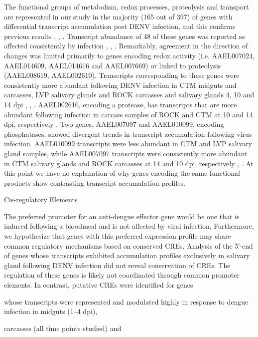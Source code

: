 The functional groups of metabolism, redox processes, proteolysis and transport are represented in our study in the majority (165 out of 397) of genes with differential transcript accumulation post DENV infection, and this confirms previous results \cite{Xi2008}, \cite{Behura2011}, \cite{Colpitts2011}.
Transcript abundance of 48 of these genes was reported as affected consistently by infection \cite{Xi2008}, \cite{Luplertlop2011}, \cite{Behura2011}.
Remarkably, agreement in the direction of changes was limited primarily to genes encoding redox activity (i.e.
AAEL007024, AAEL014609, AAEL014616 and AAEL007669) or linked to proteolysis (AAEL008619, AAEL002610).
Transcripts corresponding to these genes were consistently more abundant following DENV infection in CTM midguts and carcasses, LVP salivary glands and ROCK carcasses and salivary glands 4, 10 and 14 dpi \cite{Xi2008}, \cite{Luplertlop2011}, \cite{Sim2012}.
AAEL002610, encoding a protease, has transcripts that are more abundant following infection in carcass samples of ROCK and CTM at 10 and 14 dpi, respectively \cite{Xi2008}.
Two genes, AAEL007097 and AAEL010099, encoding phosphatases, showed divergent trends in transcript accumulation following virus infection.
AAEL010099 transcripts were less abundant in CTM and LVP salivary gland samples, while AAEL007097 transcripts were consistently more abundant in CTM salivary glands and ROCK carcasses at 14 and 10 dpi, respectively \cite{Xi2008}, \cite{Luplertlop2011}.
At this point we have no explanation of why genes encoding the same functional products show contrasting transcript accumulation profiles.

Cis-regulatory Elements

The preferred promoter for an anti-dengue effector gene would be one that is induced following a bloodmeal and is not affected by viral infection.
Furthermore, we hypothesize that genes with this preferred expression profile may share common regulatory mechanisms based on conserved CREs.
\alert{Analysis of the 5′-end of genes whose transcripts exhibited accumulation profiles exclusively in salivary gland following DENV infection did not reveal conservation of CREs.
The regulation of these genes is likely not coordinated through common promoter elements.} In contrast, putative CREs were identified for genes

whose transcripts were represented and modulated highly in response to dengue infection in midguts (1–4 dpi),

carcasses (all time points studied) and

